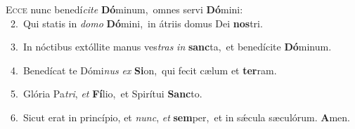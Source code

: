 \lettrine{\initial\textcolor{\initialcolor}{E}}{cce} nunc benedí\-\textit{ci}\-\textit{te} \textbf{Dó}\-minum,~\star omnes servi \textbf{Dó}\-mini:\\
{\numbfont\textcolor{\numbcolor}{~2.}}~Qui statis in \textit{do}\-\textit{mo} \textbf{Dó}\-mini,~\star in átriis domus Dei \textbf{nos}\-tri.\par
{\numbfont\textcolor{\numbcolor}{~3.}}~In nóctibus extóllite manus ves\textit{tras} \textit{in} \textbf{sanc}\-ta,~\star et benedícite \textbf{Dó}\-minum.\par
{\numbfont\textcolor{\numbcolor}{~4.}}~Benedícat te Dómi\textit{nus} \textit{ex} \textbf{Si}\-on,~\star qui fecit cælum et \textbf{ter}\-ram.\par
{\numbfont\textcolor{\numbcolor}{~5.}}~Glória Pa\-\textit{tri}\-, \textit{et} \textbf{Fí}\-lio,~\star et Spirítui \textbf{Sanc}\-to.\par
{\numbfont\textcolor{\numbcolor}{~6.}}~Sicut erat in princípio, et \textit{nunc}\-, \textit{et} \textbf{sem}\-per,~\star et in sǽcula sæculórum. \textbf{A}\-men.\par
